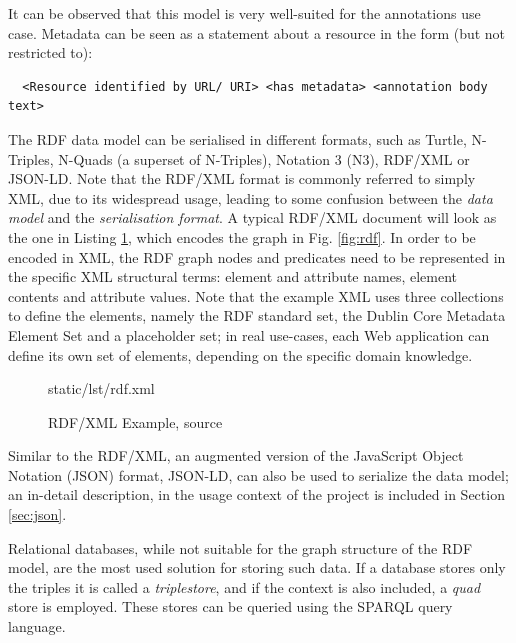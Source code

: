 It can be observed that this model is very well-suited for the annotations use
case. Metadata can be seen as a statement about a resource in the form (but
not restricted to):

\begin{verbatim}
  <Resource identified by URL/ URI> <has metadata> <annotation body text>
\end{verbatim}

The RDF data model can be serialised in different formats, such as Turtle,
N-Triples, N-Quads (a superset of N-Triples), Notation 3 (N3), RDF/XML or
JSON-LD. Note that the RDF/XML format is commonly referred to simply XML, due
to its widespread usage, leading to some confusion between the \textit{data
  model} and the \textit{serialisation format}. A typical RDF/XML document will
look as the one in Listing \ref{lst:rdf}, which encodes the graph in Fig.
\ref{fig:rdf}. In order to be encoded in XML, the RDF graph nodes
and predicates need to be represented in the specific XML structural terms:
element and attribute names, element contents and attribute values. Note that
the example XML uses three collections to define the elements, namely the RDF
standard set, the Dublin Core Metadata Element Set \cite{ref:dc} and a
placeholder set; in real use-cases, each Web application can define its own set
of elements, depending on the specific domain knowledge.

\begin{figure}[!h]
  
    {static/lst/rdf.xml}
    \caption[RDF/XML Example]
            {RDF/XML Example, source \cite{ref:rdfsyntax}}
    \label{lst:rdf}
\end{figure}

Similar to the RDF/XML, an augmented version of the JavaScript Object Notation
(JSON) format, JSON-LD, can also be used to serialize the data model; an
in-detail description, in the usage context of the project is included in
Section \ref{sec:json}.

Relational databases, while not suitable for the graph structure of the RDF
model, are the most used solution for storing such data. If a database stores
only the triples it is called a \textit{triplestore}, and if the context is
also included, a \textit{quad} store is employed. These stores can be queried
using the SPARQL \cite{ref:sparql} query language.

